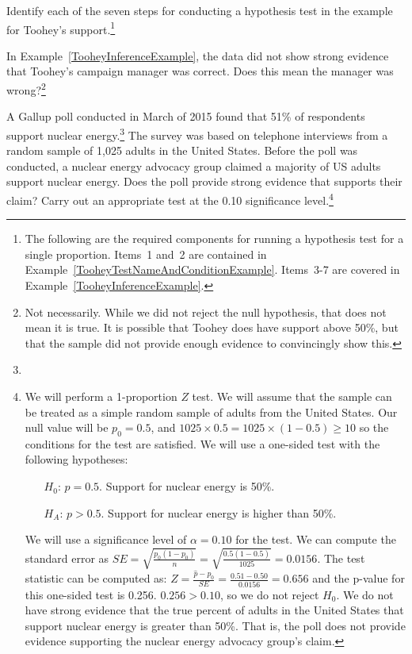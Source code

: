 \begin{exercise}
Identify each of the seven steps for conducting a hypothesis test in the example for Toohey's support.\footnote{The following are the required components for running a hypothesis test for a single proportion. Items~1 and~2 are contained in Example~\ref{TooheyTestNameAndConditionExample}. Items~3-7 are covered in Example~\ref{TooheyInferenceExample}.}
\end{exercise}

\begin{exercise}
In Example~\ref{TooheyInferenceExample}, the data did not show strong evidence that Toohey's campaign manager was correct. Does this mean the manager was wrong?\footnote{Not necessarily. While we did not reject the null hypothesis, that does not mean it is true. It is possible that Toohey does have support above 50\%, but that the sample did not provide enough evidence to convincingly show this.}
\end{exercise}


\begin{exercise}
A Gallup poll conducted in March of 2015 found that 51\% of respondents support nuclear energy.\footnote{} The survey was based on telephone interviews from a random sample of 1,025 adults in the United States. Before the poll was conducted, a nuclear energy advocacy group claimed a majority of US adults support nuclear energy. Does the poll provide strong evidence that supports their claim? Carry out an appropriate test at the 0.10 significance level.\footnote{We will perform a 1-proportion $Z$ test.  We will assume that the sample can be treated as a simple random sample of adults from the United States.  Our null value will be $p_0 = 0.5$, and $1025\times 0.5=1025\times(1-0.5)\ge10$ so the conditions for the test are satisfied. We will use a one-sided test with the following hypotheses:
\begin{itemize}
\item[$H_0$:] $p = 0.5$. Support for nuclear energy is 50\%.
\item[$H_A$:] $p > 0.5$. Support for nuclear energy is higher than 50\%.
\end{itemize}
We will use a significance level of $\alpha = 0.10$ for the test. We can compute the standard error as $SE = \sqrt{\frac{p_0 (1 - p_0)}{n}} = \sqrt{\frac{0.5 (1 - 0.5)}{1025}} = 0.0156$.  The test statistic can be computed as: $Z = \frac{\hat{p} - p_0}{SE} = \frac{0.51 - 0.50}{0.0156} = 0.656$ and the p-value for this one-sided test is 0.256.  $0.256>0.10$, so we do not reject $H_0$.  We do not have strong evidence that the true percent of adults in the United States that support nuclear energy is greater than 50\%. That is, the poll does not provide evidence supporting the nuclear energy advocacy group's claim.}
\end{exercise}


